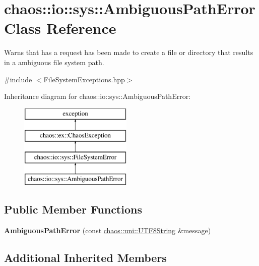 \hypertarget{classchaos_1_1io_1_1sys_1_1_ambiguous_path_error}{}\section{chaos\+:\+:io\+:\+:sys\+:\+:Ambiguous\+Path\+Error Class Reference}
\label{classchaos_1_1io_1_1sys_1_1_ambiguous_path_error}


Warns that has a request has been made to create a file or directory that results in a ambiguous file system path.  




{\ttfamily \#include $<$File\+System\+Exceptions.\+hpp$>$}

Inheritance diagram for chaos\+:\+:io\+:\+:sys\+:\+:Ambiguous\+Path\+Error\+:\begin{figure}[H]
\begin{center}
\leavevmode
\includegraphics[height=4.000000cm]{classchaos_1_1io_1_1sys_1_1_ambiguous_path_error}
\end{center}
\end{figure}
\subsection*{Public Member Functions}
\begin{DoxyCompactItemize}
\item 
\hypertarget{classchaos_1_1io_1_1sys_1_1_ambiguous_path_error_a2c52d7f24bd88b11da5542f87b1b0bd9}{}{\bfseries Ambiguous\+Path\+Error} (const \hyperlink{classchaos_1_1uni_1_1_u_t_f8_string}{chaos\+::uni\+::\+U\+T\+F8\+String} \&message)\label{classchaos_1_1io_1_1sys_1_1_ambiguous_path_error_a2c52d7f24bd88b11da5542f87b1b0bd9}

\end{DoxyCompactItemize}
\subsection*{Additional Inherited Members}


